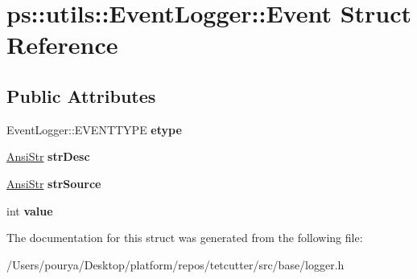 \hypertarget{structps_1_1utils_1_1EventLogger_1_1Event}{}\section{ps\+:\+:utils\+:\+:Event\+Logger\+:\+:Event Struct Reference}
\label{structps_1_1utils_1_1EventLogger_1_1Event}
\subsection*{Public Attributes}
\begin{DoxyCompactItemize}
\item 
\hypertarget{structps_1_1utils_1_1EventLogger_1_1Event_abd567d95cdef3c2d7d1582e32604beff}{}Event\+Logger\+::\+E\+V\+E\+N\+T\+T\+Y\+P\+E {\bfseries etype}\label{structps_1_1utils_1_1EventLogger_1_1Event_abd567d95cdef3c2d7d1582e32604beff}

\item 
\hypertarget{structps_1_1utils_1_1EventLogger_1_1Event_a2492f5382f17bceb58d0a3f0526bd856}{}\hyperlink{classps_1_1base_1_1CAString}{Ansi\+Str} {\bfseries str\+Desc}\label{structps_1_1utils_1_1EventLogger_1_1Event_a2492f5382f17bceb58d0a3f0526bd856}

\item 
\hypertarget{structps_1_1utils_1_1EventLogger_1_1Event_aff09bc1a51cf30196c5de540eaa138b2}{}\hyperlink{classps_1_1base_1_1CAString}{Ansi\+Str} {\bfseries str\+Source}\label{structps_1_1utils_1_1EventLogger_1_1Event_aff09bc1a51cf30196c5de540eaa138b2}

\item 
\hypertarget{structps_1_1utils_1_1EventLogger_1_1Event_a99b03414776fc8b1ce2608279b900222}{}int {\bfseries value}\label{structps_1_1utils_1_1EventLogger_1_1Event_a99b03414776fc8b1ce2608279b900222}

\end{DoxyCompactItemize}


The documentation for this struct was generated from the following file\+:\begin{DoxyCompactItemize}
\item 
/\+Users/pourya/\+Desktop/platform/repos/tetcutter/src/base/logger.\+h\end{DoxyCompactItemize}
